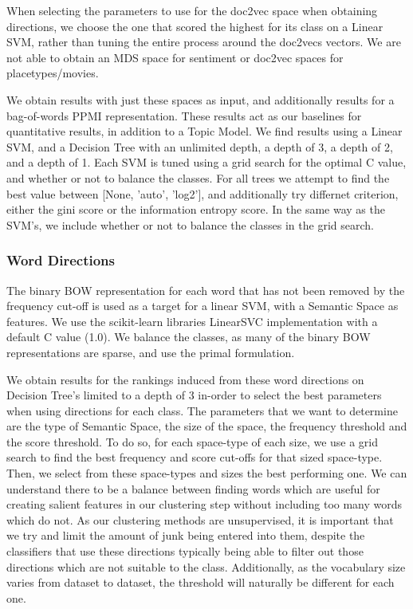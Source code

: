 When selecting the parameters to use for the doc2vec space when obtaining directions, we choose the one that scored the highest for its class on a Linear SVM, rather than tuning the entire process around the doc2vecs vectors.
We are not able to obtain an MDS space for sentiment or doc2vec spaces for placetypes/movies.

We obtain results with just these spaces as input, and additionally results for a bag-of-words PPMI representation. These results act as our baselines for quantitative results, in addition to a Topic Model. We find results using a Linear SVM, and a Decision Tree with an unlimited depth, a depth of 3, a depth of 2, and a depth of 1. Each SVM is tuned using a grid search for the optimal C value, and whether or not to balance the classes. For all trees we attempt to find the best value between [None, 'auto', 'log2'], and additionally try differnet criterion, either the gini score or the information entropy score. In the same way as the SVM's, we include whether or not to balance the classes in the grid search.

\subsubsection{Word Directions}
The binary BOW representation for each word that has not been removed by the frequency cut-off is used as a target for a linear SVM, with a Semantic Space as features. We use the scikit-learn libraries LinearSVC implementation with a default C value (1.0). We balance the classes, as many of the binary BOW representations are sparse, and use the primal formulation. %

We obtain results for the rankings induced from these word directions on Decision Tree's limited to a depth of 3 in-order to select the best parameters when using directions for each class. The parameters that we want to determine are the type of Semantic Space, the size of the space, the frequency threshold and the score threshold. To do so, for each space-type of each size, we use a grid search to find the best frequency and score cut-offs for that sized space-type. Then, we select from these space-types and sizes the best performing one. We can understand there to be a balance between finding words which are useful for creating salient features in our clustering step without including too many words which do not. As our clustering methods are unsupervised, it is important that we try and limit the amount of junk being entered into them, despite the classifiers that use these directions typically being able to filter out those directions which are not suitable to the class. Additionally, as the vocabulary size varies from dataset to dataset, the threshold will naturally be different for each one. 

